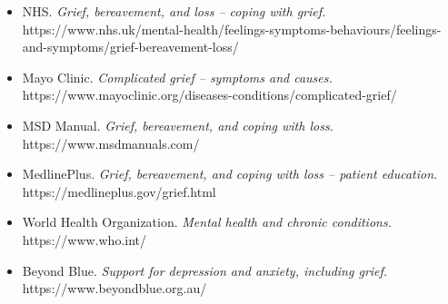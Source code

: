 \begin{itemize}
    \item NHS. \textit{Grief, bereavement, and loss -- coping with grief.} https://www.nhs.uk/mental-health/feelings-symptoms-behaviours/feelings-and-symptoms/grief-bereavement-loss/
    \item Mayo Clinic. \textit{Complicated grief -- symptoms and causes.} https://www.mayoclinic.org/diseases-conditions/complicated-grief/
    \item MSD Manual. \textit{Grief, bereavement, and coping with loss.} https://www.msdmanuals.com/
    \item MedlinePlus. \textit{Grief, bereavement, and coping with loss -- patient education.} https://medlineplus.gov/grief.html
    \item World Health Organization. \textit{Mental health and chronic conditions.} https://www.who.int/
    \item Beyond Blue. \textit{Support for depression and anxiety, including grief.} https://www.beyondblue.org.au/
\end{itemize}
